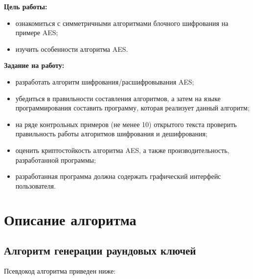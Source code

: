 \documentclass[utf8x, 14pt, bold, times]{G7-32} %
\begin{document}
\frontmatter %



\maketitle

\newpage
\tableofcontents

\nobreakingbeforechapters

\newpage
\Introduction

\textbf{Цель работы:}
\begin{itemize}
\item ознакомиться с симметричными алгоритмами блочного шифрования на
      примере AES;
\item изучить особенности алгоритма AES.
\end{itemize}

\textbf{Задание на работу:}
\begin{itemize}
\item разработать алгоритм шифрования/расшифровывания AES;
\item убедиться в правильности составления алгоритмов, а затем на языке
      программирования составить программу, которая реализует данный алгоритм;
\item на ряде контрольных примеров (не менее 10) открытого текста проверить
      правильность работы алгоритмов шифрования и дешифрования;
\item оценить криптостойкость алгоритма AES, а также производительность,
      разработанной программы;
\item разработанная программа должна содержать графический интерфейс пользователя.
\end{itemize}

\mainmatter %
\newpage

\chapter{Описание алгоритма}

\section{Алгоритм генерации раундовых ключей}

Псевдокод алгоритма приведен ниже:\\
\end{document}
